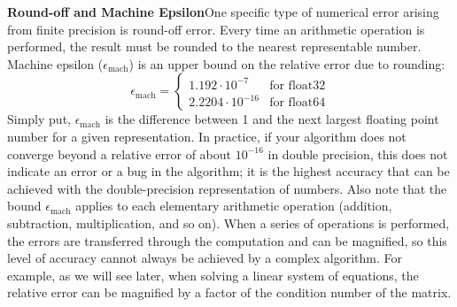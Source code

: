 \textbf{Round-off and Machine Epsilon}\quad One specific type of numerical error arising from finite precision is round-off error. Every time an arithmetic operation is performed, the result must be rounded to the nearest representable number. Machine epsilon ($\epsilon_{\text{mach}}$) is an upper bound on the relative error due to rounding:
\begin{equation*}
    \epsilon_{\text{mach}} =
    \begin{cases}
        1.192\cdot 10^{-7} & \text{for float32} \\
        2.2204\cdot 10^{-16} & \text{for float64}
    \end{cases}
\end{equation*}
Simply put, $\epsilon_{\text{mach}}$ is the difference between 1 and the next largest floating point number for a given representation.
In practice, if your algorithm does not converge beyond a relative error of about $10^{-16}$ in double precision, this does not indicate an error or a bug in the algorithm; it is the highest accuracy that can be achieved with the double-precision representation of numbers.
Also note that the bound $\epsilon_{\text{mach}}$ applies to each elementary arithmetic operation (addition, subtraction, multiplication, and so on).
When a series of operations is performed, the errors are transferred through the computation and can be magnified, so this level of accuracy cannot always be achieved by a complex algorithm.
For example, as we will see later, when solving a linear system of equations, the relative error can be magnified by a factor of the condition number of the matrix.


